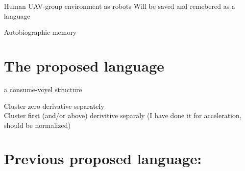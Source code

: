 \begin{frame}{Human UAV-group environment as robots}
    Will be saved and remebered as a language
    
    Autobiographic memory
    
    
    \section{The proposed language}
        a consume-voyel structure
        
        Cluster zero derivative separately\\
        
        Cluster first (and/or above) derivitive separaly
        (I have done it for acceleration, should be normalized)
    
    
    \section{Previous proposed language:}

\end{frame}
